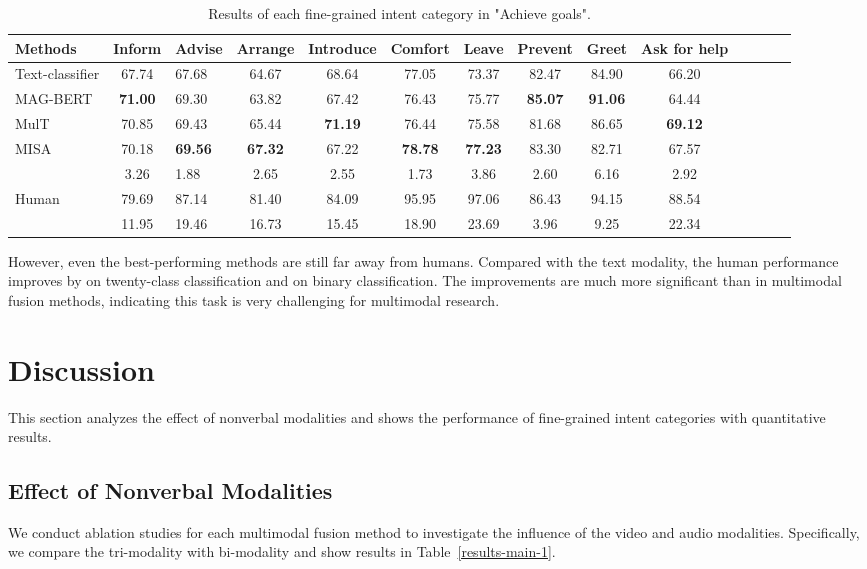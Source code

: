 \documentclass[sigconf,camera-ready]{acmart}
\begin{document}
\begin{table*}\small
		\caption{\label{goal_results_each_class} Results of each fine-grained intent category in "Achieve goals".
	}
	\renewcommand\tabcolsep{3pt} 
	\centering
		\begin{tabular*}{\textwidth}{l|c@{\extracolsep{\fill}}lccccccccccc} 
		\midrule
		Methods & Inform  &Advise & Arrange & Introduce & Comfort & Leave & Prevent & Greet & Ask for help\\
		\midrule
		\multicolumn{1}{l|}{Text-classifier}  & 67.74 & 67.68 & 64.67 & 68.64 & 77.05 & 73.37 & 82.47 & 84.90 & 66.20   \\
		\midrule
		\multicolumn{1}{l|}{MAG-BERT}  & \textbf{71.00} & 69.30 & 63.82 & 67.42 & 76.43 & 75.77 & \textbf{85.07} & \textbf{91.06} & 64.44 \\
		\multicolumn{1}{l|}{MulT}  & 
        70.85 & 69.43 & 65.44 & \textbf{71.19} & 76.44 & 75.58 & 81.68 & 86.65 & \textbf{69.12} \\
		\multicolumn{1}{l|}{MISA} & 
		70.18 & \textbf{69.56} & \textbf{67.32} & 67.22 & \textbf{78.78} & \textbf{77.23} & 83.30 & 82.71 & 67.57   \\
		\multicolumn{1}{l|}{} & 3.26 & 1.88 & 2.65 & 2.55 & 1.73 & 3.86 & 2.60 & 6.16 & 2.92 \\
		\midrule
		\multicolumn{1}{l|}{Human}  & 79.69 & 87.14 & 81.40 & 84.09 & 95.95 & 97.06 & 86.43 & 94.15 & 88.54 \\
		\multicolumn{1}{l|}{}  & 11.95 & 19.46 & 16.73 & 15.45 & 18.90 & 23.69 & 3.96 & 9.25 & 22.34 \\
		\bottomrule
	\end{tabular*}
\end{table*}

However, even the best-performing methods are still far away from humans. Compared with the text modality, the human performance improves by  on twenty-class classification and  on binary classification. The improvements are much more significant than in multimodal fusion methods, indicating this task is very challenging for multimodal research. 


\section{Discussion}
This section analyzes the effect of nonverbal modalities and shows the performance of fine-grained intent categories with quantitative results.
\subsection{Effect of Nonverbal Modalities}
We conduct ablation studies for each multimodal fusion method to investigate the influence of the video and audio modalities. Specifically, we compare the tri-modality with bi-modality and show results in Table~\ref{results-main-1}.
\end{document}
